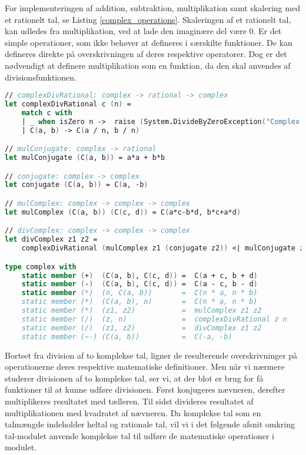 For implementeringen af addition, subtraktion, multiplikation samt skalering med et rationelt tal, se Listing \ref{complex_operations}. Skaleringen af et rationelt tal, kan udledes fra multiplikation, ved at lade den imaginære del være $0$. Er det simple operationer, som ikke behøver at defineres i særskilte funktioner. De kan defineres direkte på overskrivningen af deres respektive operatorer. Dog er det nødvendigt at definere multiplikation som en funktion, da den skal anvendes af divisionsfunktionen. 
\begin{lstlisting}[language={FSharp}, 
    label={complex_operations},
    caption={Overskrivning af operationer på komplekse tal}]
// complexDivRational: complex -> rational -> complex
let complexDivRational c (n) = 
    match c with
    | _ when isZero n ->  raise (System.DivideByZeroException("Complex.divRational: Cannot divide by zero!"))
    | C(a, b) -> C(a / n, b / n) 

// mulConjugate: complex -> rational
let mulConjugate (C(a, b)) = a*a + b*b

// conjugate: complex -> complex
let conjugate (C(a, b)) = C(a, -b)

// mulComplex: complex -> complex -> complex
let mulComplex (C(a, b)) (C(c, d)) = C(a*c-b*d, b*c+a*d)

// divComplex: complex -> complex -> complex
let divComplex z1 z2 =
    complexDivRational (mulComplex z1 (conjugate z2)) <| mulConjugate z2

type complex with
    static member (+)  (C(a, b), C(c, d)) =  C(a + c, b + d)
    static member (-)  (C(a, b), C(c, d)) =  C(a - c, b - d)
    static member (*)  (n, C(a, b))       =  C(n * a, n * b)
    static member (*)  (C(a, b), n)       =  C(n * a, n * b)
    static member (*)  (z1, z2)           =  mulComplex z1 z2
    static member (/)  (z, n)             =  complexDivRational z n
    static member (/)  (z1, z2)           =  divComplex z1 z2 
    static member (~-) (C(a, b))          =  C(-a, -b)
\end{lstlisting}    

Bortset fra division af to komplekse tal, ligner de resulterende overskrivninger på operationerne deres respektive matematiske definitioner. Men når vi nærmere studerer divisionen af to komplekse tal, ser vi, at der blot er brug for få funktioner til at kunne udføre divisionen. Først konjugeres nævneren, derefter multiplikeres resultatet med tælleren. Til sidst divideres resultatet af multiplikationen med kvadratet af nævneren. Da komplekse tal som en talmængde indeholder heltal og rationale tal, vil vi i det følgende afsnit omkring tal-modulet anvende komplekse tal til udføre de matematiske operationer i modulet.


